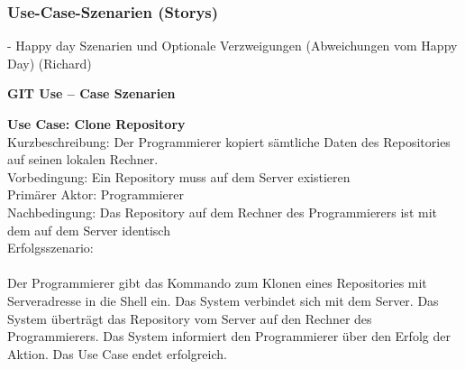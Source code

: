 \documentclass[a4paper]{article}
\begin{document}
\newpage	
\subsubsection{Use-Case-Szenarien (Storys)}

	- Happy day Szenarien und Optionale Verzweigungen (Abweichungen vom Happy Day) (Richard)
	
\textbf{GIT   Use – Case Szenarien}

\textbf{Use Case: 			Clone Repository}\\
Kurzbeschreibung: 	Der Programmierer kopiert sämtliche Daten des Repositories auf seinen lokalen Rechner.\\
Vorbedingung:	Ein Repository muss auf dem Server existieren\\
Primärer Aktor:	Programmierer\\
Nachbedingung:	Das Repository auf dem Rechner des Programmierers ist mit dem auf dem Server identisch\\
Erfolgsszenario:\\
\\
Der Programmierer gibt das Kommando zum Klonen eines Repositories mit Serveradresse in die Shell ein. Das System verbindet sich mit dem Server. Das System überträgt das Repository vom Server auf den Rechner des Programmierers. Das System informiert den Programmierer über den Erfolg der Aktion. Das Use Case endet erfolgreich.\\
\\
\end{document}
